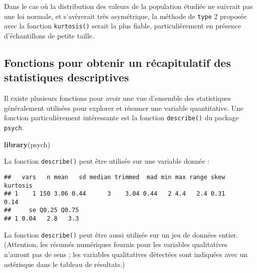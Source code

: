 \documentclass[
  french,
]{book}
\newenvironment{Shaded}{\begin{snugshade}}{\end{snugshade}}
\newcommand{\DataTypeTok}[1]{\textcolor[rgb]{0.13,0.29,0.53}{#1}}
\newcommand{\FloatTok}[1]{\textcolor[rgb]{0.00,0.00,0.81}{#1}}
\newcommand{\KeywordTok}[1]{\textcolor[rgb]{0.13,0.29,0.53}{\textbf{#1}}}
\newcommand{\NormalTok}[1]{#1}
\newcommand{\OperatorTok}[1]{\textcolor[rgb]{0.81,0.36,0.00}{\textbf{#1}}}
\begin{document}
Dans le cas où la distribution des valeurs de la population étudiée ne suivrait pas une loi normale, et s'avèrerait très asymétrique, la méthode de \texttt{type} 2 proposée avec la fonction \texttt{kurtosis()} serait la plus fiable, particulièrement en présence d'échantillons de petite taille.

\hypertarget{fonctions-pour-obtenir-un-ruxe9capitulatif-des-statistiques-descriptives}{%
\subsection{Fonctions pour obtenir un récapitulatif des statistiques descriptives}\label{fonctions-pour-obtenir-un-ruxe9capitulatif-des-statistiques-descriptives}}

Il existe plusieurs fonctions pour avoir une vue d'ensemble des statistiques généralement utilisées pour explorer et résumer une variable quantitative. Une fonction particulièrement intéressante est la fonction \texttt{describe()} du package \texttt{psych}.

\begin{Shaded}
\begin{Highlighting}[]
\KeywordTok{library}\NormalTok{(psych)}
\end{Highlighting}
\end{Shaded}

La fonction \texttt{describe()} peut être utilisée sur une variable donnée :

\begin{Shaded}
\end{Shaded}

\begin{verbatim}
##   vars   n mean   sd median trimmed  mad min max range skew kurtosis
## 1    1 150 3.06 0.44      3    3.04 0.44   2 4.4   2.4 0.31     0.14
##     se Q0.25 Q0.75
## 1 0.04   2.8   3.3
\end{verbatim}

La fonction \texttt{describe()} peut être aussi utilisée sur un jeu de données entier. (Attention, les résumés numériques fournis pour les variables qualitatives n'auront pas de sens ; les variables qualitatives détectées sont indiquées avec un astérisque dans le tableau de résultats.)
\end{document}
